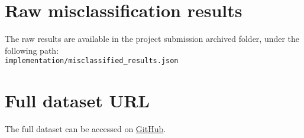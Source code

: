 \section{Raw misclassification results}
\label{sec:raw-misclassification-results}
The raw results are available in the project submission archived folder, under the following path: \\
\verb|implementation/misclassified_results.json|

\section{Full dataset URL}
\label{sec:full-dataset-url}
The full dataset can be accessed on \href{https://github.com/dont-text-me/RoastedCoffeeDefectDataset}{GitHub}.